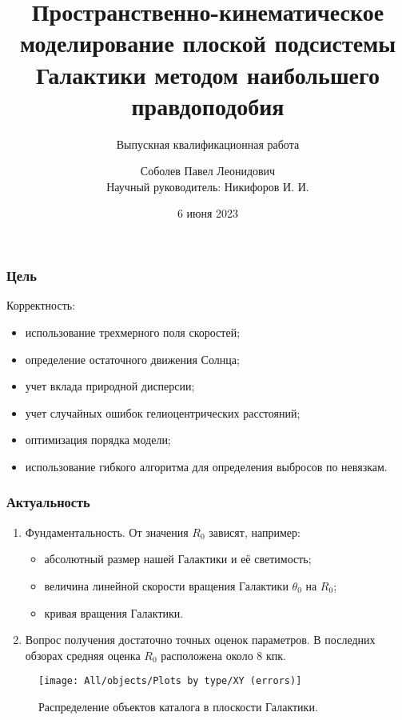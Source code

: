 \documentclass{beamer}
\title{Пространственно-кинематическое моделирование плоской подсистемы Галактики методом наибольшего правдоподобия}
\subtitle{Выпускная квалификационная работа}
\author{Соболев Павел Леонидович\\Научный руководитель: Никифоров И. И.}
\date{6 июня 2023}
\begin{document}
\begin{frame}[plain]
\titlepage
\end{frame}

\begin{frame}
\frametitle{Цель}
Корректность:
\begin{itemize}
  \item использование трехмерного поля скоростей;
  \item определение остаточного движения Солнца;
  \item учет вклада природной дисперсии;
  \item учет случайных ошибок гелиоцентрических расстояний;
  \item оптимизация порядка модели;
  \item использование гибкого алгоритма для определения выбросов по невязкам.
\end{itemize}
\end{frame}

\begin{frame}
\frametitle{Актуальность}
\begin{enumerate}
  \item Фундаментальность. От значения $ R_0 $ зависят, например:
  \begin{itemize}
    \item абсолютный размер нашей Галактики и её светимость;
    \item величина линейной скорости вращения Галактики $ \theta_0 $ на $ R_0 $;
    \item кривая вращения Галактики.
  \end{itemize}
  \item Вопрос получения достаточно точных оценок параметров. В последних обзорах средняя оценка $ R_0 $ расположена около 8 кпк.
\end{enumerate}
\end{frame}

\begin{frame}
\vspace{1em}
\begin{figure}
  \centering
  \texttt{[image: All/objects/Plots by type/XY (errors)]}
  \caption{Распределение объектов каталога в плоскости Галактики.}
\end{figure}
\end{frame}
\end{document}
